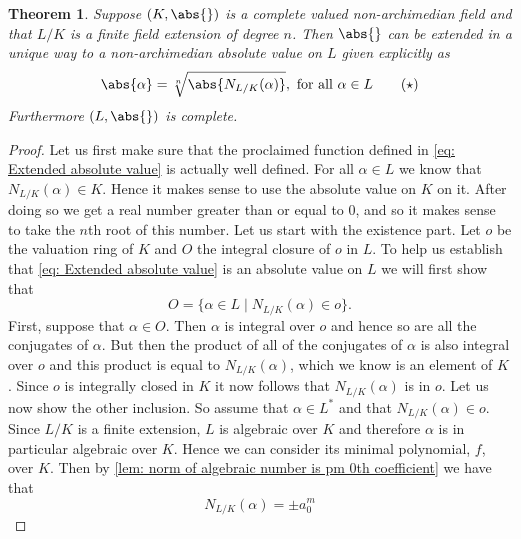 \documentclass{article}
\newtheorem{theorem}{Theorem}[section]
\numberwithin{equation}{section}
\begin{document}
\begin{theorem}\label{thm: Extension of absolute value}
	Suppose $(K, \abs{})$ is a complete valued non-archimedian field and that $L/K$ is a finite field extension of degree $n$. Then $\abs{}$ can be extended in a unique way to a non-archimedian absolute value on $L$ given explicitly as
	\begin{equation}\label{eq: Extended absolute value}
    	\abs{\alpha} = \sqrt[n]{\abs{N_{L/K}(\alpha)}}, \text{ for all } \alpha \in L\tag{$\star$}
	\end{equation}
	Furthermore $(L, \abs{})$ is complete.
\end{theorem}
\begin{proof}
	Let us first make sure that the proclaimed function defined in \cref{eq: Extended absolute value} is actually well defined. For all $\alpha \in L$ we know that $N_{L/K}(\alpha) \in K$. Hence it makes sense to use the absolute value on $K$ on it. After doing so we get a real number greater than or equal to 0, and so it makes sense to take the $n$th root of this number. Let us start with the existence part. Let $o$ be the valuation ring of $K$ and $O$ the integral closure of $o$ in $L$. To help us establish that \cref{eq: Extended absolute value} is an absolute value on $L$ we will first show that
	\begin{equation}\label{eq: Extension of absolute value helper result}
    	O = \{\alpha \in L \mid N_{L/K}(\alpha) \in o \}.\tag{$\triangle$}
	\end{equation}
	First, suppose that $\alpha \in O$. Then $\alpha$ is integral over $o$ and hence so are all the conjugates of $\alpha$. But then the product of all of the conjugates of $\alpha$ is also integral over $o$ and this product is equal to $N_{L/K}(\alpha)$, which we know is an element of $K$. Since $o$ is integrally closed in $K$ it now follows that $N_{L/K}(\alpha)$ is in $o$. Let us now show the other inclusion. So assume that $\alpha \in L^*$ and that $N_{L/K}(\alpha) \in o$. Since $L / K$ is a finite extension, $L$ is algebraic over $K$ and therefore $\alpha$ is in particular algebraic over $K$. Hence we can consider its minimal polynomial, $f$, over $K$. Then by \cref{lem: norm of algebraic number is pm 0th coefficient} we have that
	$$N_{L / K}(\alpha) =  \pm a_0^m$$

\end{proof}
\end{document}
